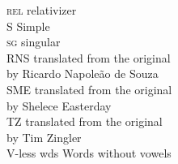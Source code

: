 \begin{multicols}{2}
\begin{tabbing}
\textsc{rel}      \> relativizer\\
S                 \> Simple\\
\textsc{sg}       \> singular\\
RNS      \> translated from the original\\ \> by Ricardo Napoleão de Souza\\
SME      \> translated from the original\\ \> by Shelece Easterday\\
TZ      \> translated from the original\\ \> by Tim Zingler\\
V-less wds       \> Words without vowels
\end{tabbing}
\end{multicols}

